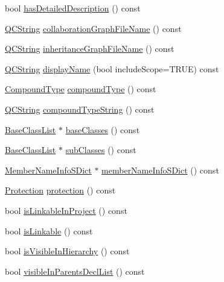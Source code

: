 \begin{DoxyCompactItemize}
\item 
bool \mbox{\hyperlink{class_class_def_ae82303a3ca4f00eafe79322a56263887}{has\+Detailed\+Description}} () const
\item 
\mbox{\hyperlink{class_q_c_string}{Q\+C\+String}} \mbox{\hyperlink{class_class_def_a6070aff6274033d7fef0335f9b0ab580}{collaboration\+Graph\+File\+Name}} () const
\item 
\mbox{\hyperlink{class_q_c_string}{Q\+C\+String}} \mbox{\hyperlink{class_class_def_a714d75ee2764face244bcb0e4b2b9261}{inheritance\+Graph\+File\+Name}} () const
\item 
\mbox{\hyperlink{class_q_c_string}{Q\+C\+String}} \mbox{\hyperlink{class_class_def_aa891187c2712372f19ee6c202df24fec}{display\+Name}} (bool include\+Scope=T\+R\+UE) const
\item 
\mbox{\hyperlink{class_class_def_ae70cf86d35fe954a94c566fbcfc87939}{Compound\+Type}} \mbox{\hyperlink{class_class_def_a6dc63f555dae8c2e55f8fc586ec70860}{compound\+Type}} () const
\item 
\mbox{\hyperlink{class_q_c_string}{Q\+C\+String}} \mbox{\hyperlink{class_class_def_aa9f6b0d40e7eedee9a80810051fdc6c7}{compound\+Type\+String}} () const
\item 
\mbox{\hyperlink{class_base_class_list}{Base\+Class\+List}} $\ast$ \mbox{\hyperlink{class_class_def_a680372e530fc79972086c9b940a72dcb}{base\+Classes}} () const
\item 
\mbox{\hyperlink{class_base_class_list}{Base\+Class\+List}} $\ast$ \mbox{\hyperlink{class_class_def_aeb1cb317a13036ab2689586513b92f83}{sub\+Classes}} () const
\item 
\mbox{\hyperlink{class_member_name_info_s_dict}{Member\+Name\+Info\+S\+Dict}} $\ast$ \mbox{\hyperlink{class_class_def_a63a304d56ef1f0c11097069619c0a273}{member\+Name\+Info\+S\+Dict}} () const
\item 
\mbox{\hyperlink{types_8h_a90e352184df58cd09455fe9996cd4ded}{Protection}} \mbox{\hyperlink{class_class_def_a013bf8c79e1db7c5314e53855ee95260}{protection}} () const
\item 
bool \mbox{\hyperlink{class_class_def_a54fd0971529bf396c31a2a5c67acbea7}{is\+Linkable\+In\+Project}} () const
\item 
bool \mbox{\hyperlink{class_class_def_ab42c120a9326e77882857bc53ab2b7e0}{is\+Linkable}} () const
\item 
bool \mbox{\hyperlink{class_class_def_ad529a3402d450f318ed610833c9bb0d2}{is\+Visible\+In\+Hierarchy}} () const
\item 
bool \mbox{\hyperlink{class_class_def_ae593150ad67e83a461c3a1105c50e97d}{visible\+In\+Parents\+Decl\+List}} () const

\end{DoxyCompactItemize}
